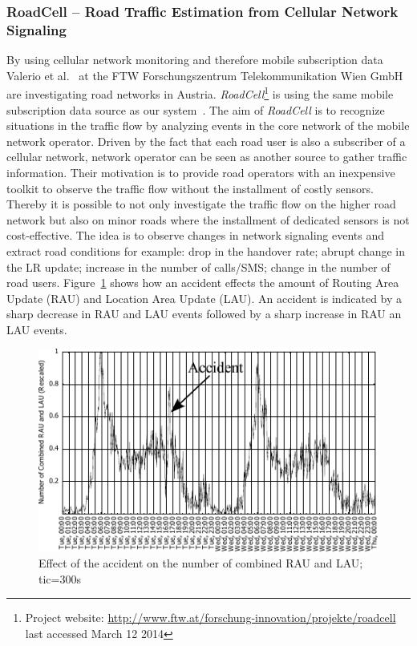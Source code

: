 \documentclass[master,english]{hgbthesis}
\begin{document}
\subsubsection{RoadCell -- Road Traffic Estimation from Cellular Network Signaling}
By using cellular network monitoring and therefore mobile subscription data Valerio et al.~\cite{Valerio2009,Valerio20092} at the FTW Forschungszentrum Telekommunikation Wien GmbH are investigating road networks in Austria. \emph{RoadCell}\footnote{Project website: \url{http://www.ftw.at/forschung-innovation/projekte/roadcell} last accessed March 12 2014} is using the same mobile subscription data source as our system~\cite{RoadCell2009}. The aim of \emph{RoadCell} is to recognize situations in the traffic flow by analyzing events in the core network of the mobile network operator. Driven by the fact that each road user is also a subscriber of a cellular network, network operator can be seen as another source to gather traffic information. Their motivation is to provide road operators with an inexpensive toolkit to observe the traffic flow without the installment of costly sensors. Thereby it is possible to not only investigate the traffic flow on the higher road network but also on minor roads where the installment of dedicated sensors is not cost-effective.
The idea is to observe changes in network signaling events and extract road conditions for example: drop in the handover rate; abrupt change in the LR update; increase in the number of calls/SMS; change in the number of road users. Figure~\ref{fig:raodcell_accident} shows how an accident effects the amount of Routing Area Update (RAU) and Location Area Update (LAU). An accident is indicated by a sharp decrease in RAU and LAU events followed by a sharp increase in RAU an LAU events.
\begin{figure}
\centering
\includegraphics[width=0.7\linewidth]{./images/raodcell_accident}
\caption{Effect of the accident on the number of combined RAU and LAU; tic=300s \cite{Valerio20092}}
\label{fig:raodcell_accident}
\end{figure}
\end{document}
